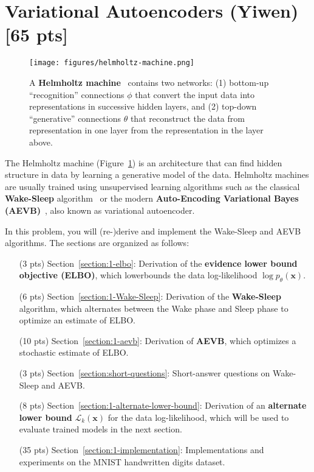 \section{Variational Autoencoders (Yiwen) [65 pts]}
\label{sec:vae}

\begin{figure}[h]
\centering
\texttt{[image: figures/helmholtz-machine.png]}
\caption{A \textbf{Helmholtz machine}~\cite{hinton1995wake,dayan2000helmholtz} contains two networks: (1) bottom-up ``recognition'' connections $\phi$ that convert the input data into representations in successive hidden layers, and (2) top-down ``generative'' connections $\theta$ that reconstruct the data from representation in one layer from the representation in the layer above.
\label{fig:helmholtz-machine}}
\end{figure}

The Helmholtz machine (Figure~\ref{fig:helmholtz-machine}) is an architecture that can find hidden structure in data by learning a generative model of the data. Helmholtz machines are usually trained using unsupervised learning algorithms such as the classical \textbf{Wake-Sleep} algorithm~\cite{hinton1995wake} or the modern \textbf{Auto-Encoding Variational Bayes (AEVB)}~\cite{kingma2013auto}, also known as variational autoencoder.

In this problem, you will (re-)derive and implement the Wake-Sleep and AEVB algorithms. The sections are organized as follows:
\begin{itemize}
    \item[(3 pts)] Section~\ref{section:1-elbo}: Derivation of the \textbf{evidence lower bound objective (ELBO)}, which lowerbounds the data log-likelihood $\log p_\theta(\mathbf{x})$.
    \item[(6 pts)] Section~\ref{section:1-Wake-Sleep}: Derivation of the \textbf{Wake-Sleep} algorithm, which alternates between the Wake phase and Sleep phase to optimize an estimate of ELBO.
    \item[(10 pts)] Section~\ref{section:1-aevb}: Derivation of \textbf{AEVB}, which optimizes a stochastic estimate of ELBO.
    \item[(3 pts)] Section~\ref{section:short-questions}: Short-answer questions on Wake-Sleep and AEVB.
    \item[(8 pts)] Section~\ref{section:1-alternate-lower-bound}: Derivation of an \textbf{alternate lower bound} $\mathcal{L}_k(\mathbf{x})$ for the data log-likelihood, which will be used to evaluate trained models in the next section.
    \item[(35 pts)] Section~\ref{section:1-implementation}: Implementations and experiments on the MNIST handwritten digits dataset.
\end{itemize}

